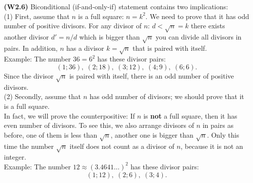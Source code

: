 \documentclass[jou]{apa6}
\begin{document}
{\bf (W2.6)} Biconditional (if-and-only-if) statement contains two 
implications:\\
(1) First, assume that $n$ is a full square: $n = k^2$. We need to 
prove that it has odd number of positive divisors.
For any divisor of $n$: $d < \sqrt{n}=k$ there exists another divisor 
$d' = n/d$ which is bigger than $\sqrt{n}$ \textendash{} you can 
divide all divisors in pairs. In addition, $n$ has a divisor $k = \sqrt{n}$
that is paired with itself.\\
Example: The number $36=6^2$ has these divisor pairs:
$$(1;36),\;(2;18),\;(3;12),\;(4;9),\;(6;6).$$
Since the divisor $\sqrt{n}$ is paired with itself, there is
an odd number of positive divisors.\\
(2) Secondly, assume that $n$ has odd number of divisors; we should prove
that it is a full square.\\
In fact, we will prove the counterpositive: If $n$ is {\bf not} a full square, 
then it has even number of divisors. To see this, we also arrange divisors
of $n$ in pairs \textendash{} as before, one of them is less than $\sqrt{n}$, another
one is bigger than $\sqrt{n}$. Only this time the number $\sqrt{n}$ itself
does not count as a divisor of $n$, because it is not an integer.\\
Example: The number $12 \approx (3.4641\ldots)^2$ has these divisor pairs:
$$(1;12),\;(2;6),\;(3;4).$$
\end{document}
